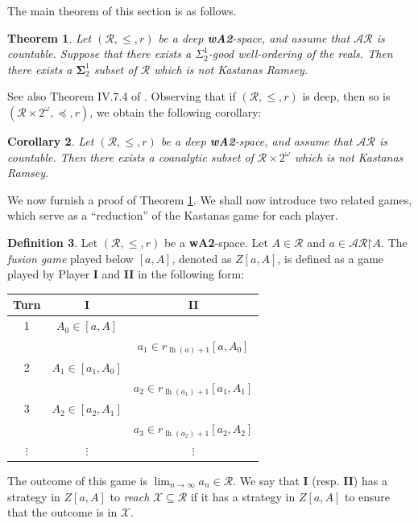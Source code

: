 \documentclass[11pt,reqno]{amsart}
\theoremstyle{plain}
\numberwithin{equation}{section}
\newtheorem{theorem}{Theorem}[section]
\newtheorem{corollary}[theorem]{Corollary}
\theoremstyle{definition}
\newtheorem{definition}[theorem]{Definition}
\newcommand{\func}{\operatorname}
\newcommand{\cal}{\mathcal}
\newcommand{\restrictedto}{\mathord{\upharpoonright}}
\newcommand{\X}{\cal{X}}
\newcommand{\lh}{\func{lh}}
\begin{document}
The main theorem of this section is as follows. 

\begin{theorem}
\label{thm:sigma_1^2.wo.gives.non.kr.set}
    Let $(\cal{R},\leq,r)$ be a deep \textbf{wA2}-space, and assume that $\cal{AR}$ is countable. Suppose that there exists a $\Sigma_2^1$-good well-ordering of the reals. Then there exists a $\mathbf{\Sigma}_2^1$ subset of $\cal{R}$ which is not Kastanas Ramsey.
\end{theorem}

See also Theorem IV.7.4 of \cite{AT05}. Observing that if $(\cal{R},\leq,r)$ is deep, then so is $(\cal{R} \times 2^\omega,\preceq,r)$, we obtain the following corollary:

\begin{corollary}
\label{cor:r.times.2^omega.has.coanalytic.non.kr.set}
    Let $(\cal{R},\leq,r)$ be a deep \textbf{wA2}-space, and assume that $\cal{AR}$ is countable. Then there exists a coanalytic subset of $\cal{R} \times 2^\omega$ which is not Kastanas Ramsey.
\end{corollary}

We now furnish a proof of Theorem \ref{thm:sigma_1^2.wo.gives.non.kr.set}. We shall now introduce two related games, which serve as a ``reduction'' of the Kastanas game for each player.

\begin{definition}
\label{def:fusion.game}
    Let $(\cal{R},\leq,r)$ be a \textbf{wA2}-space. Let $A \in \cal{R}$ and $a \in \cal{AR}\restrictedto A$. The \emph{fusion game} played below $[a,A]$, denoted as $Z[a,A]$, is defined as a game played by Player \textbf{I} and \textbf{II} in the following form:
    \begin{center}
        \begin{tabular}{c|c|c}
           Turn & \textbf{I} & \textbf{II} \\
            \hline
           1 & $A_0 \in [a,A]$ & \\
            & & $a_1 \in r_{\lh(a)+1}[a,A_0]$ \\
            \hline
           2 & $A_1 \in [a_1,A_0]$ & \\
            & & $a_2 \in r_{\lh(a_1)+1}[a_1,A_1]$ \\
            \hline
           3 &  $A_2 \in [a_2,A_1]$ & \\
            & & $a_3 \in r_{\lh(a_2)+1}[a_2,A_2]$ \\
            \hline
            $\vdots$ & $\vdots$ & $\vdots$
        \end{tabular}
    \end{center}
    The outcome of this game is $\lim_{n \to \infty} a_n \in \cal{R}$. We say that \textbf{I} (resp. \textbf{II}) has a strategy in $Z[a,A]$ to \emph{reach} $\X \subseteq \cal{R}$ if it has a strategy in $Z[a,A]$ to ensure that the outcome is in $\X$. 
\end{definition}
\end{document}
